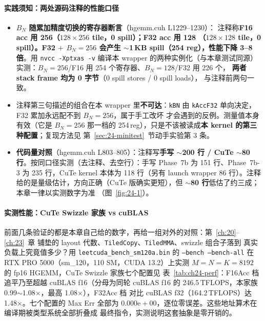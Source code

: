 \paragraph{实践须知：两处源码注释的性能口径}\label{sec:24-kaogu}

\begin{itemize}
  \item \textbf{$B_N$ 随累加精度切换的寄存器断言}（hgemm.cuh L1229--1230）：
        注释称\textbf{F16 acc 用 256（$128\times256$ tile，0 spill）；F32 acc 用 128
        （$128\times128$ tile，0 spill）。F32 $+$ $B_N{=}256$ 会产生
        $\sim$1\,KB spill（254 reg），性能下降 3--8 倍}。用
        \texttt{nvcc -Xptxas -v} 编译本 wrapper 的两种实例化（与本章测试同源）
        实测：$B_N{=}256$/F16 用 254 个寄存器、$B_N{=}128$/F32 用 226 个，
        \textbf{两者 stack frame 均为 0 字节}（0 spill stores / 0 spill loads），
        与注释前两句一致。
  \item 注释第三句描述的组合在本 wrapper 里\textbf{不可达}：\texttt{kBN} 由
        \texttt{kAccF32} 单向决定，F32 累加永远配不到 $B_N=256$，属于手工改坏
        才会遇到的反例。测量值本身有效（它是 $B_N{=}256$ 那一档的
        254\,reg），只是不该被读成\textbf{本 kernel 的第三种配置}；复现方法见
        第~\ref{sec:24-minitest}~节动手实验第 3 条。
  \item \textbf{代码量对照}（hgemm.cuh L803--805）：注释写\textbf{手写 $\sim$200 行 /
        CuTe $\sim$80 行}。按同口径实测（去注释、去空行）：手写 Phase~7b 为
        151 行、Phase~7b-3 为 235 行，CuTe kernel 本体为 118 行（另有 launch
        wrapper 86 行）。注释给的是量级估计，方向正确（CuTe 版确实更短），但
        \textbf{$\sim$80 行}低估了约三成；本章一律以实测数字为准
        （图~\ref{fig:24-1}）。
\end{itemize}

\paragraph{实测性能：CuTe Swizzle 家族 vs cuBLAS}\label{sec:ch24-perf}

前面几条验证的都是本章自己给的数字，再给一组对外的对照：第~\ref{ch:20}--\ref{ch:23}~章
铺垫的 layout 代数、\texttt{TiledCopy}、\texttt{TiledMMA}、swizzle 组合子落到
真实负载上究竟值多少？用 \texttt{leetcuda\_\allowbreak{}bench\_\allowbreak{}sm120a.\allowbreak{}bin} 的
\texttt{--bench --bench-all} 在 RTX PRO 5000（sm\_120，110 SM，CUDA 13.2）上实测
$M{=}N{=}K{=}8192$ 的 fp16 HGEMM，CuTe Swizzle 家族七个配置见
表~\ref{tab:ch24-perf}：F16Acc 档追平乃至超越 cuBLAS f16（分母为同轮 cuBLAS
f16 的 246.5\,TFLOPS，本家族 0.99$\sim$1.08$\times$，最高 1.08$\times$），F32Acc 档
对比 cuBLAS f32（164.2\,TFLOPS）达 1.48$\times$。七个配置的 Max Err 全部为
$0.000\mathrm{e}{+}00$，逐位零误差。这些地址算术在编译期被类型系统全部折叠成
最终指令，实测说明这套抽象是零开销的。

